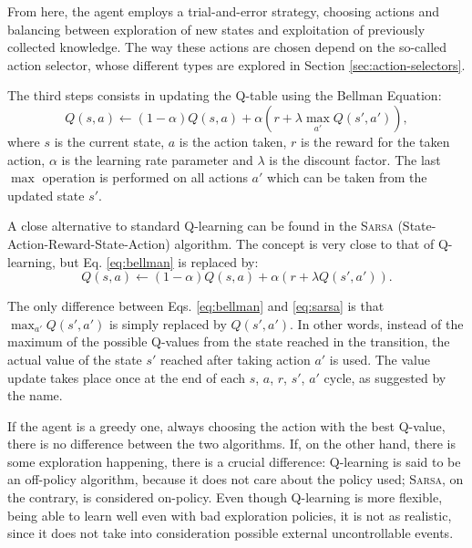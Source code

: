 \documentclass[a4paper, 12pt]{article}
\numberwithin{equation}{section}
\begin{document}
From here, the agent employs a trial-and-error strategy, choosing actions and balancing between exploration of new states and exploitation of previously collected knowledge. The way these actions are chosen depend on the so-called action selector, whose different types are explored in Section \ref{sec:action-selectors}.


The third steps consists in updating the Q-table using the Bellman Equation:
\begin{equation}\label{eq:bellman}
	Q\left(s,a\right)\leftarrow \left(1-\alpha\right)Q\left(s,a\right)+\alpha\left(r+\lambda\max_{a'}Q\left(s',a'\right)\right),
\end{equation}
where $s$ is the current state, $a$ is the action taken, $r$ is the reward for the taken action, $\alpha$ is the learning rate parameter and $\lambda$ is the discount factor. The last $\max$ operation is performed on all actions $a'$ which can be taken from the updated state $s'$.


A close alternative to standard Q-learning can be found in the \textsc{Sarsa} (State-Action-Reward-State-Action) algorithm. The concept is very close to that of Q-learning, but Eq. \eqref{eq:bellman} is replaced by:
\begin{equation}\label{eq:sarsa}
	Q\left(s,a\right)\leftarrow \left(1-\alpha\right)Q\left(s,a\right)+\alpha\left(r+\lambda Q\left(s',a'\right)\right).
\end{equation}

The only difference between Eqs. \eqref{eq:bellman} and \eqref{eq:sarsa} is that $\max_{a'}Q\left(s',a'\right)$ is simply replaced by $Q\left(s',a'\right)$. In other words, instead of the maximum of the possible Q-values from the state reached in the transition, the actual value of the state $s'$ reached after taking action $a'$ is used. The value update takes place once at the end of each $s$, $a$, $r$, $s'$, $a'$ cycle, as suggested by the name.

If the agent is a greedy one, always choosing the action with the best Q-value, there is no difference between the two algorithms. If, on the other hand, there is some exploration happening, there is a crucial difference: Q-learning is said to be an off-policy algorithm, because it does not care about the policy used; \textsc{Sarsa}, on the contrary, is considered on-policy. Even though Q-learning is more flexible, being able to learn well even with bad exploration policies, it is not as realistic, since it does not take into consideration possible external uncontrollable events.
\end{document}
